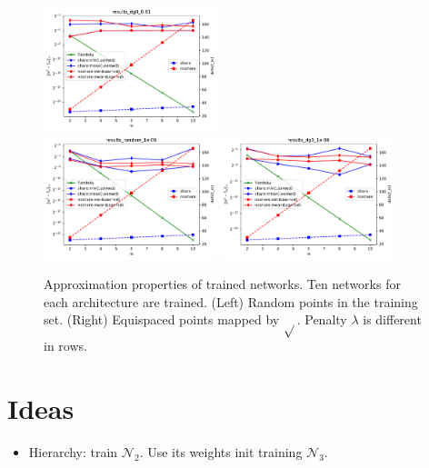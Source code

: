\documentclass[onetab, a4paper]{siamart171218}
\theoremstyle{remark}
\begin{document}
\begin{figure}
\begin{center}
  \includegraphics[width=0.45\textwidth]{./img/results_dg0_001}\\
  \includegraphics[width=0.45\textwidth]{./img/results_random_1e-06}
  \includegraphics[width=0.45\textwidth]{./img/results_dg0_1e-06}\\
  \end{center}
  \caption{Approximation properties of trained networks. Ten networks
    for each architecture are trained. (Left) Random
    points in the training set. (Right) Equispaced points mapped by $\sqrt{}$.
    Penalty $\lambda$ is different in rows.}
  \label{fig:comparison}
\end{figure}

\newpage
\section{Ideas}
\begin{itemize}
  \item Hierarchy: train $\mathcal{N}_2$. Use its weights init training $\mathcal{N}_3$.
\end{itemize}




\end{document}
